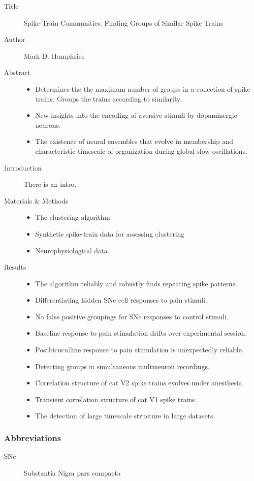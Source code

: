\documentclass[a4paper,12pt]{article}
\theoremstyle{definition}
\begin{document}
\begin{description}
  \item[Title] Spike-Train Communities: Finding Groups of Similar Spike Trains
  \item[Author] Mark D. Humphries
  \item[Abstract]

    \begin{itemize}
      \item Determines the the maximum number of groups in a collection of spike trains. Groups the trains according to similarity.
      \item New insights into the encoding of aversive stimuli by dopaminergic neurons.
      \item The existence of neural ensembles that evolve in membership and characteristic timescale of organization during global slow oscillations.
    \end{itemize}

  \item[Introduction] There is an intro.

  \item[Materials \& Methods]
    \begin{itemize}
      \item The clustering algorithm
      \item Synthetic spike-train data for assessing clustering
      \item Neurophysiological data
    \end{itemize}

  \item[Results]
    \begin{itemize}
      \item The algorithm reliably and robustly finds repeating spike patterns.
      \item Differentiating hidden SNc cell responses to pain stimuli.
      \item No false positive groupings for SNc responses to control stimuli.
      \item Baseline response to pain stimulation drifts over experimental session.
      \item Postbicuculline response to pain stimulation is unexpectedly reliable.
      \item Detecting groups in simultaneous multineuron recordings.
      \item Correlation structure of cat V2 spike trains evolves under anesthesia.
      \item Transient correlation structure of cat V1 spike trains.
      \item The detection of large timescale structure in large datasets.
    \end{itemize}

\end{description}

\subsubsection*{Abbreviations}
\begin{description}
  \item[SNc] Substantia Nigra pars compacta
  \item[]
\end{description}
\end{document}
